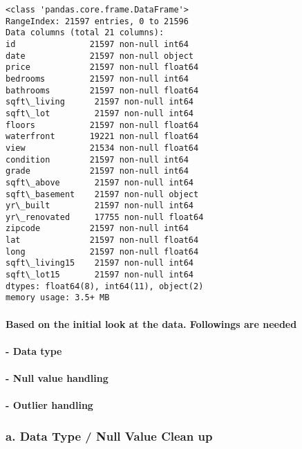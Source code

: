 \documentclass[11pt]{article}
\begin{document}
    \begin{Verbatim}[commandchars=\\\{\}]
<class 'pandas.core.frame.DataFrame'>
RangeIndex: 21597 entries, 0 to 21596
Data columns (total 21 columns):
id               21597 non-null int64
date             21597 non-null object
price            21597 non-null float64
bedrooms         21597 non-null int64
bathrooms        21597 non-null float64
sqft\_living      21597 non-null int64
sqft\_lot         21597 non-null int64
floors           21597 non-null float64
waterfront       19221 non-null float64
view             21534 non-null float64
condition        21597 non-null int64
grade            21597 non-null int64
sqft\_above       21597 non-null int64
sqft\_basement    21597 non-null object
yr\_built         21597 non-null int64
yr\_renovated     17755 non-null float64
zipcode          21597 non-null int64
lat              21597 non-null float64
long             21597 non-null float64
sqft\_living15    21597 non-null int64
sqft\_lot15       21597 non-null int64
dtypes: float64(8), int64(11), object(2)
memory usage: 3.5+ MB

    \end{Verbatim}

    \paragraph{Based on the initial look at the data. Followings are
needed}\label{based-on-the-initial-look-at-the-data.-followings-are-needed}

\paragraph{- Data type}\label{data-type}

\paragraph{- Null value handling}\label{null-value-handling}

\paragraph{- Outlier handling}\label{outlier-handling}

    \subsubsection{a. Data Type / Null Value Clean
up}\label{a.-data-type-null-value-clean-up}
\end{document}
